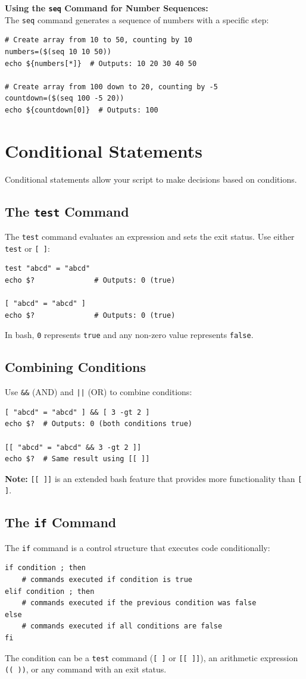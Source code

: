 \textbf{Using the \texttt{seq} Command for Number Sequences:}\\
The \texttt{seq} command generates a sequence of numbers with a specific step:
\begin{lstlisting}[language=Terminal]
# Create array from 10 to 50, counting by 10
numbers=($(seq 10 10 50))
echo ${numbers[*]}  # Outputs: 10 20 30 40 50

# Create array from 100 down to 20, counting by -5
countdown=($(seq 100 -5 20))
echo ${countdown[0]}  # Outputs: 100
\end{lstlisting}

\section{Conditional Statements}
Conditional statements allow your script to make decisions based on conditions.

\subsection{The \texttt{test} Command}
The \texttt{test} command evaluates an expression and sets the exit status. Use either \texttt{test} or \texttt{[ ]}:
\begin{lstlisting}[language=Terminal]
test "abcd" = "abcd"
echo $?              # Outputs: 0 (true)

[ "abcd" = "abcd" ]
echo $?              # Outputs: 0 (true)
\end{lstlisting}
In bash, \texttt{0} represents \texttt{true} and any non-zero value represents \texttt{false}.

\subsection{Combining Conditions}
Use \texttt{\&\&} (AND) and \texttt{||} (OR) to combine conditions:
\begin{lstlisting}[language=Terminal]
[ "abcd" = "abcd" ] && [ 3 -gt 2 ]
echo $?  # Outputs: 0 (both conditions true)

[[ "abcd" = "abcd" && 3 -gt 2 ]]
echo $?  # Same result using [[ ]]
\end{lstlisting}
\textbf{Note:} \texttt{[[ ]]} is an extended bash feature that provides more functionality than \texttt{[ ]}.

\subsection{The \texttt{if} Command}
The \texttt{if} command is a control structure that executes code conditionally:
\begin{lstlisting}[language=Terminal]
if condition ; then
    # commands executed if condition is true
elif condition ; then
    # commands executed if the previous condition was false
else
    # commands executed if all conditions are false
fi
\end{lstlisting}
The condition can be a \texttt{test} command (\texttt{[ ]} or \texttt{[[ ]]}), an arithmetic expression \texttt{(( ))}, or any command with an exit status.

